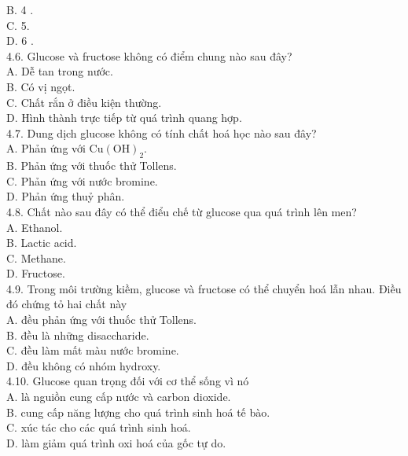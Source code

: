 \documentclass[10pt]{article}
\begin{document}
B. 4 .\\
C. 5.\\
D. 6 .\\
4.6. Glucose và fructose không có điểm chung nào sau đây?\\
A. Dễ tan trong nước.\\
B. Có vị ngọt.\\
C. Chất rắn ở điều kiện thường.\\
D. Hình thành trực tiếp từ quá trình quang hợp.\\
4.7. Dung dịch glucose không có tính chất hoá học nào sau đây?\\
A. Phản ứng với $\mathrm{Cu}(\mathrm{OH})_{2}$.\\
B. Phản ứng với thuốc thử Tollens.\\
C. Phản ứng với nước bromine.\\
D. Phản ứng thuỷ phân.\\
4.8. Chất nào sau đây có thể điểu chế từ glucose qua quá trình lên men?\\
A. Ethanol.\\
B. Lactic acid.\\
C. Methane.\\
D. Fructose.\\
4.9. Trong môi trường kiềm, glucose và fructose có thể chuyển hoá lẫn nhau. Điều đó chứng tỏ hai chất này\\
A. đều phản ứng với thuốc thử Tollens.\\
B. đều là những disaccharide.\\
C. đều làm mất màu nước bromine.\\
D. đều không có nhóm hydroxy.\\
4.10. Glucose quan trọng đối với cơ thể sống vì nó\\
A. là nguiồn cung cấp nước và carbon dioxide.\\
B. cung cấp năng lượng cho quá trình sinh hoá tế bào.\\
C. xúc tác cho các quá trình sinh hoá.\\
D. làm giảm quá trình oxi hoá của gốc tự do.
\end{document}
